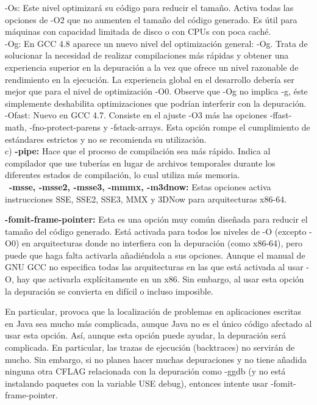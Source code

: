 ﻿\documentclass[a4paper]{article}
\begin{document}
-Os: Este nivel optimizará su código para reducir el tamaño. Activa todas las opciones de -O2 que no aumenten el tamaño del código generado. Es útil para máquinas con capacidad limitada de disco o con CPUs con poca caché.\\

-Og: En GCC 4.8 aparece un nuevo nivel del optimización general: -Og. Trata de solucionar la necesidad de realizar compilaciones más rápidas y obtener una experiencia superior en la depuración a la vez que ofrece un nivel razonable de rendimiento en la ejecución. La experiencia global en el desarrollo debería ser mejor que para el nivel de optimización -O0. Observe que -Og no implica -g, éste simplemente deshabilita optimizaciones que podrían interferir con la depuración.\\

-Ofast: Nuevo en GCC 4.7. Consiste en el ajuste -O3 más las opciones -ffast-math, -fno-protect-parens y -fstack-arrays. Esta opción rompe el cumplimiento de estándares estrictos y no se recomienda su utilización.\\

c) \textbf{-pipe:} Hace que el proceso de compilaci\'on sea m\'as r\'apido. Indica al compilador que use tuber\'ias en lugar de archivos temporales durante los diferentes estados de compilaci\'on, lo cual utiliza m\'as memoria.
\\ \
\textbf{-msse, -msse2, -msse3, -mmmx, -m3dnow:} Estas opciones activa instrucciones SSE, SSE2, SSE3, MMX y 3DNow para arquitecturas x86-64. 

\textbf{-fomit-frame-pointer:} Esta es una opción muy común diseñada para reducir el tamaño del código generado. Está activada para todos los niveles de -O (excepto -O0) en arquitecturas donde no interfiera con la depuración (como x86-64), pero puede que haga falta activarla añadiéndola a sus opciones. Aunque el manual de GNU GCC no especifica todas las arquitecturas en las que está activada al usar -O, hay que activarla explícitamente en un x86. Sin embargo, al usar esta opción la depuración se convierta en difícil o incluso imposible.

En particular, provoca que la localización de problemas en aplicaciones escritas en Java sea mucho más complicada, aunque Java no es el único código afectado al usar esta opción. Así, aunque esta opción puede ayudar, la depuración será complicada. En particular, las trazas de ejecución (backtraces) no servirán de mucho. Sin embargo, si no planea hacer muchas depuraciones y no tiene añadida ninguna otra CFLAG relacionada con la depuración como -ggdb (y no está instalando paquetes con la variable USE debug), entonces intente usar -fomit-frame-pointer. 
 
\end{document}
